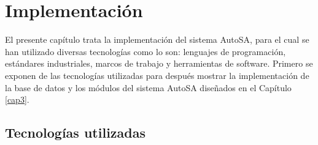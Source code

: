 \chapter{Implementación}\label{cap4}
El presente capítulo trata la implementación del sistema AutoSA, para el cual se han utilizado diversas tecnologías como lo son: lenguajes de programación, estándares industriales, marcos de trabajo y herramientas de software. Primero se exponen de las tecnologías utilizadas para después mostrar la implementación de la base de datos y los módulos del sistema AutoSA diseñados en el Capítulo \ref{cap3}.
\section{Tecnologías utilizadas}
